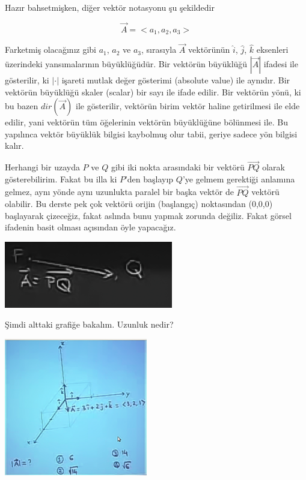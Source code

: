 \documentclass[12pt,fleqn]{article}\usepackage{../../common}
\begin{document}
Hazır bahsetmişken, diğer vektör notasyonu şu şekildedir

$$ \vec{A} = < a_1, a_2, a_3 > $$

Farketmiş olacağınız gibi $a_1$, $a_2$ ve $a_3$, sırasıyla $ \vec{A} $
vektörünün $\hat{i}$, $\hat{j}$, $\hat{k}$ eksenleri üzerindeki yansımalarının
büyüklüğüdür. Bir vektörün büyüklüğü $|\vec{A}|$ ifadesi ile gösterilir, ki
$|\cdot|$ işareti mutlak değer gösterimi (absolute value) ile aynıdır. Bir
vektörün büyüklüğü skaler (scalar) bir sayı ile ifade edilir. Bir vektörün yönü,
ki bu bazen $dir(\vec{A})$ ile gösterilir, vektörün birim vektör haline
getirilmesi ile elde edilir, yani vektörün tüm öğelerinin vektörün büyüklüğüne
bölünmesi ile. Bu yapılınca vektör büyüklük bilgisi kaybolmuş olur tabii, geriye
sadece yön bilgisi kalır.

Herhangi bir uzayda $P$ ve $Q$ gibi iki nokta arasındaki bir vektörü $\vec{PQ}$
olarak gösterebilirim. Fakat bu illa ki $P$'den başlayıp $Q$'ye gelmem gerektiği
anlamına gelmez, aynı yönde aynı uzunlukta paralel bir başka vektör de
$\vec{PQ}$ vektörü olabilir. Bu derste pek çok vektörü orijin (başlangıç)
noktasından (0,0,0) başlayarak çizeceğiz, fakat aslında bunu yapmak zorunda
değiliz. Fakat görsel ifadenin basit olması açısından öyle yapacağız.

\begin{center}
\includegraphics[height=2.9cm]{1_2.png}
\end{center}

Şimdi alttaki grafiğe bakalım. Uzunluk nedir?

\begin{center}
\includegraphics[height=6cm]{1_3.png}
\end{center}
\end{document}
